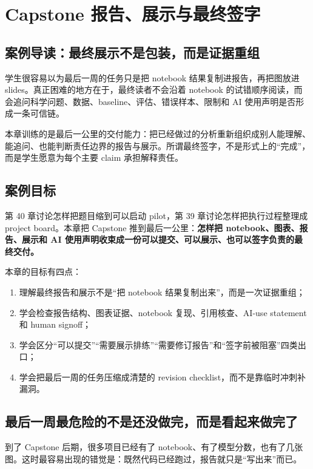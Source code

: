 \chapter{Capstone 报告、展示与最终签字}

\section{案例导读：最终展示不是包装，而是证据重组}

学生很容易以为最后一周的任务只是把 notebook 结果复制进报告，再把图放进 slides。真正困难的地方在于，最终读者不会沿着 notebook 的试错顺序阅读，而会追问科学问题、数据、baseline、评估、错误样本、限制和 AI 使用声明是否形成一条可信链。

本章训练的是最后一公里的交付能力：把已经做过的分析重新组织成别人能理解、能追问、也能判断责任边界的报告与展示。所谓最终签字，不是形式上的“完成”，而是学生愿意为每个主要 claim 承担解释责任。

\section{案例目标}

第 40 章讨论怎样把题目缩到可以启动 pilot，第 39 章讨论怎样把执行过程整理成 project board。本章把 Capstone 推到最后一公里：\textbf{怎样把 notebook、图表、报告、展示和 AI 使用声明收束成一份可以提交、可以展示、也可以签字负责的最终交付。}

本章的目标有四点：

\begin{enumerate}
    \item 理解最终报告和展示不是“把 notebook 结果复制出来”，而是一次证据重组；
    \item 学会检查报告结构、图表证据、notebook 复现、引用核查、AI-use statement 和 human signoff；
    \item 学会区分“可以提交”“需要展示排练”“需要修订报告”和“签字前被阻塞”四类出口；
    \item 学会把最后一周的任务压缩成清楚的 revision checklist，而不是靠临时冲刺补漏洞。
\end{enumerate}

\section{最后一周最危险的不是还没做完，而是看起来做完了}

到了 Capstone 后期，很多项目已经有了 notebook、有了模型分数，也有了几张图。这时最容易出现的错觉是：既然代码已经跑过，报告就只是“写出来”而已。

